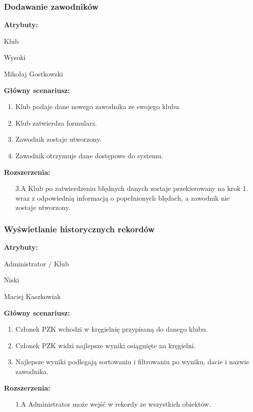 \documentclass[polish, a4paper]{article}
\begin{document}
\subsubsection{Dodawanie zawodników}
\noindent
\textbf{Atrybuty:}
\begin{description}[labelindent=0.5cm]
    \item[Główny aktor:]{Klub}
    \item[Priorytet:]{Wysoki}
    \item[Źródło:]{Mikołaj Gostkowski}
\end{description}

\noindent
\textbf{Główny scenariusz:}
\begin{enumerate}
    \item Klub podaje dane nowego zawodnika ze swojego klubu.
    \item Klub zatwierdza formularz.
    \item Zawodnik zostaje utworzony.
    \item Zawodnik otrzymuje dane dostępowe do systemu.
\end{enumerate}
\noindent
\textbf{Rozszerzenia:}
\begin{itemize}
    \item[3.A] Klub po zatwierdzeniu błędnych danych zostaje przekierowany na krok 1. wraz z odpowiednią informacją o popełnionych błędach, a zawodnik nie zostaje utworzony.
\end{itemize}



\subsubsection{Wyświetlanie historycznych rekordów}
\noindent
\textbf{Atrybuty:}
\begin{description}[labelindent=0.5cm]
    \item[Główny aktor:]{Administrator / Klub}
    \item[Priorytet:]{Niski}
    \item[Źródło:]{Maciej Kaszkowiak}
\end{description}

\noindent
\textbf{Główny scenariusz:}
\begin{enumerate}
    \item Członek PZK wchodzi w kręgielnię przypisaną do danego klubu. 
    \item Członek PZK widzi najlepsze wyniki osiągnięte na kręgielni.
    \item Najlepsze wyniki podlegają sortowaniu i filtrowaniu po wyniku, dacie i nazwie zawodnika. 
\end{enumerate}
\noindent
\textbf{Rozszerzenia:}
\begin{itemize}
    \item[1.A] Administrator może wejść w rekordy ze wszystkich obiektów.
\end{itemize}
\end{document}
